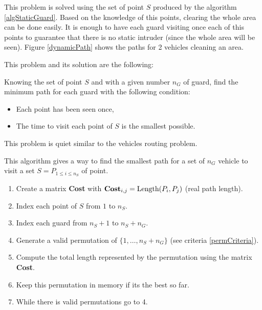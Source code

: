This problem is solved using the set of point $S$ produced by the algorithm \ref{algStaticGuard}. Based on the knowledge of this points, clearing the whole area can be done easily. It is enough to have each guard visiting once each of this points to guarantee that there is no static intruder (since the whole area will be seen). Figure \ref{dynamicPath} shows the paths for 2 vehicles cleaning an area.

This problem and its solution are the following:

\begin{subproblem}
 Knowing the set of point $S$ and with a given number $n_{G}$ of guard, find the minimum path for each guard with the following condition:
 \begin{itemize}
  \item Each point has been seen once,
  \item The time to visit each point of $S$ is the smallest possible.
 \end{itemize}
This problem is quiet similar to the vehicles routing problem.
\label{subProb3}
\end{subproblem}

\begin{algorithm}
This algorithm gives a way to find the smallest path for a set of $n_{G}$ vehicle to visit a set $S = P_{1\leq i \leq n_S}$ of point.
\begin{enumerate}
  \item Create a matrix \textbf{Cost} with $\text{\textbf{Cost}}_{i,j} = \text{Length}(P_i,P_j)$ (real path length).
  \item Index each point of $S$ from $1$ to $n_{S}$.
  \item Index each guard from $n_{S}+1$ to $ n_{S}+n_{G}$. 
  \item Generate a valid permutation of $\{1,\hdots,n_{S}+n_{G}\}$ (see criteria \ref{permCriteria}).
  \item Compute the total length represented by the permutation using the matrix \textbf{Cost}.
  \item Keep this permutation in memory if its the best so far.
  \item While there is valid permutations go to 4.
\end{enumerate}
\label{dynamicGuard}
\end{algorithm}

